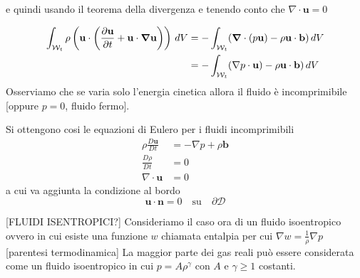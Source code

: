e quindi usando il teorema della divergenza e tenendo conto che $\nabla \cdot \mathbf{u} = 0$

\begin{equation}
\begin{split}
\int_{\mathcal{W}_t} \rho \left ( \mathbf{u} \cdot \left ( \frac{\partial \mathbf{u}}{\partial t} + \mathbf{u} \cdot \boldsymbol{\nabla} \mathbf{u} \right )\right ) \, dV
 &= - \int_{\mathcal{W}_t} ( \boldsymbol{\nabla} \cdot (p\mathbf{u}) - \rho \mathbf{u} \cdot \mathbf{b}) \, dV \\
 &=  - \int_{\mathcal{W}_t} ( \nabla p  \cdot \mathbf{u}) - \rho \mathbf{u} \cdot \mathbf{b}) \, dV
\end{split}
\end{equation}
Osserviamo che se varia solo l'energia cinetica allora il fluido è incomprimibile [oppure $p=0$, fluido fermo].
 
Si ottengono cosi le equazioni di Eulero per i fluidi incomprimibili
\begin{equation}
\boxed{
\begin{aligned}
\rho \frac{D\mathbf{u}}{Dt} &= - \nabla p + \rho \mathbf{b} \\
\frac{D \rho }{Dt} &= 0 \\
\nabla \cdot \mathbf{u} &= 0
\end{aligned}
}
\end{equation}
a cui va aggiunta la condizione al bordo 
$$\mathbf{u} \cdot \mathbf{n} = 0 \quad \text{su} \quad \partial \mathcal{D}$$
 
[FLUIDI ISENTROPICI?]
Consideriamo il caso ora di un fluido isoentropico ovvero in cui esiste una funzione $w$ chiamata entalpia per cui
$\nabla w = \frac{1}{\rho} \nabla p$
[parentesi termodinamica]
La maggior parte dei gas reali può essere considerata come un fluido isoentropico in cui $p = A \rho ^ \gamma$ con $A$ e $\gamma \geq 1$ costanti.

